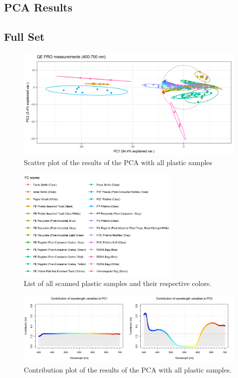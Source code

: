 \begin{appendices}
\chapter{PCA Results}
\label{app:PCA_res_full}
\section{Full Set}
\begin{figure}[H]
    \centering
    \includegraphics[width=1\textwidth]{Images/results/PCA_plastics_full_only_scat.png}
    \caption{Scatter plot of the results of the PCA with all plastic samples}
    \label{fig:PCA_plastics_only_full_scat}
\end{figure}

\begin{figure}[H]
   \centering
    \includegraphics[width=0.7\textwidth]{Images/results/PCA_plastics_full_list.png}
  \caption{List of all scanned plastic samples and their respective colors.}
  \label{fig:PCA_plastics_full_list}
\end{figure}

\begin{figure}[H]
    \centering
    \includegraphics[width=1\textwidth]{Images/results/PCA_plastics_full_doub_cont.png}
    \caption{Contribution plot of the results of the PCA with all plastic samples.}
    \label{fig:PCA_plastics_full_doub_cont}
\end{figure}


\end{appendices}
